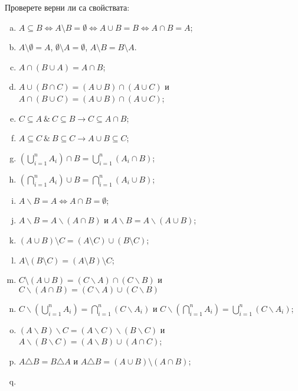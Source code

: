 \begin{problem}
  Проверете верни ли са свойствата:
  \begin{enumerate}[a)]
  \item
    $A\subseteq B \iff A\setminus B = \emptyset \iff A\cup B = B \iff A\cap B = A$;
  \item
    $A\setminus \emptyset = A$, $\emptyset\setminus A=\emptyset$, $A\setminus B = B\setminus A$.
  \item
    $A\cap (B\cup A) = A \cap B$;
  \item
    $A\cup(B\cap C) = (A\cup B)\cap(A\cup C)$ и $A \cap (B \cup C) = (A \cup B) \cap (A \cup C)$;
  \item
    $C\subseteq A\ \&\ C\subseteq B \rightarrow C\subseteq A\cap B$;
  \item
    $A\subseteq C\ \&\ B\subseteq C \rightarrow A\cup B\subseteq C$;
  \item
    $(\bigcup^{n}_{i=1} A_i) \cap B = \bigcup^{n}_{i=1} (A_i \cap B)$;
  \item
    $(\bigcap^{n}_{i=1} A_i) \cup B = \bigcap^{n}_{i=1} (A_i \cup B)$;
  \item
    $A\backslash B = A \iff A\cap B = \emptyset$;
  \item
    $A\backslash B = A\backslash (A\cap B)$ и $A\backslash B = A\backslash (A\cup B)$;
  \item
    $(A\cup B)\setminus C = (A\setminus C) \cup (B\setminus C)$;
  \item
    $A\setminus (B\setminus C) = (A\setminus B)\setminus C$;
  \item
    $C\setminus (A\cup B) = (C\backslash A)\cap(C\backslash B)$ и $C \backslash (A\cap B) = (C\backslash A)\cup(C\backslash B)$
  \item
    $C\backslash(\bigcup^{n}_{i=1} A_i) = \bigcap^{n}_{i=1} (C\backslash A_i)$ и $C \backslash(\bigcap^{n}_{i=1} A_i) = \bigcup^{n}_{i=1} (C\backslash A_i)$;
  \item
    $(A\backslash B)\backslash C = (A\backslash C)\backslash(B \backslash C)$ и $A\backslash (B\backslash C) = (A\backslash B) \cup (A\cap C)$;
  \item
    $A\triangle B = B\triangle A$ и $A \triangle B = (A \cup B)\setminus (A\cap B)$;
  \item

\end{enumerate}
\end{problem}
